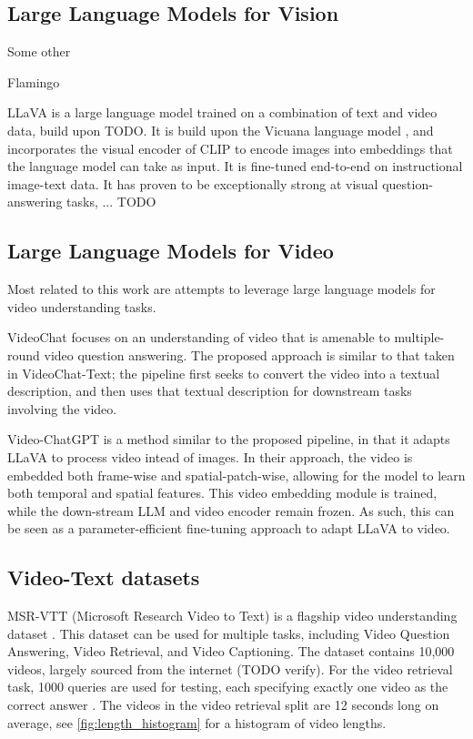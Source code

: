 \documentclass{article}
\begin{document}
\subsection{Large Language Models for Vision}

Some other 

Flamingo

LLaVA \cite{llava} is a large language model trained on a combination of text and video data, build upon TODO. 
It is build upon the Vicuana language model \cite{vicuana}, and incorporates the visual encoder of CLIP \cite{clip} to encode images into embeddings that the language model can take as input.
It is fine-tuned end-to-end on instructional image-text data.
It has proven to be exceptionally strong at visual question-answering tasks, ... TODO

\subsection{Large Language Models for Video}

Most related to this work are attempts to leverage large language models for video understanding tasks.

VideoChat \cite{videochat} focuses on an understanding of video that is amenable to multiple-round video question answering.
The proposed approach is similar to that taken in VideoChat-Text; the pipeline first seeks to convert the video into a textual description, and then uses that textual description for downstream tasks involving the video.

Video-ChatGPT \cite{videochatgpt} is a method similar to the proposed pipeline, in that it adapts LLaVA to process video intead of images.
In their approach, the video is embedded both frame-wise and spatial-patch-wise, allowing for the model to learn both temporal and spatial features.
This video embedding module is trained, while the down-stream LLM and video encoder remain frozen. As such, this can be seen as a parameter-efficient fine-tuning approach to adapt LLaVA to video.




\subsection{Video-Text datasets}
MSR-VTT (Microsoft Research Video to Text) is a flagship video understanding dataset \cite{msr-vtt}.
This dataset can be used for multiple tasks, including Video Question Answering, Video Retrieval, and Video Captioning.
The dataset contains 10,000 videos, largely sourced from the internet (TODO verify).
For the video retrieval task, 1000 queries are used for testing, each specifying exactly one video as the correct answer \cite{jsfusion}.
The videos in the video retrieval split are 12 seconds long on average, see \ref{fig:length_histogram} for a histogram of video lengths.
\end{document}
